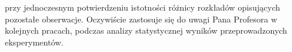 \begin{frame}
{%
%	
%	
%	
%	
%	
%	
%	
%	
%	
%	

przy jednoczesnym potwierdzeniu istotności różnicy rozkładów opisujących pozostałe obserwacje.
Oczywiście zastosuje się do uwagi Pana Profesora w kolejnych pracach, podczas analizy statystycznej wyników przeprowadzonych eksperymentów. 

}
\end{frame}


